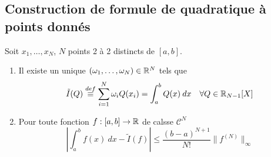 \subsection{Construction de formule de quadratique à points donnés}
\begin{prop}
    Soit $x_1, \ldots, x_N$, $N$ points 2 à 2 distincts de  $[a, b]$. 
    \begin{enumerate}
        \item Il existe un unique $(\omega_1, \ldots, \omega_N) \in \mathbb{R}^N$ tels que 
            \[
                \tilde{I}(Q) \overset{def}{\equiv} \sum_{i=1}^{N} \omega_iQ(x_i) = \int_{{a}}^{{b}} {Q(x)} \: d{x} \quad \forall Q \in \mathbb{R}_{N-1}[X]
            \] 
        \item Pour toute fonction $f: [a, b] \to \mathbb{R}$ de calsse $\mathcal{C}^N$
             \[
                 \left| \int_{{a}}^{{b}} {f(x)} \: d{x} - \tilde{I}(f) \right| \le \frac{(b-a)^{N+1}}{N!}\|f^{(N)}\|_{\infty}
            \] 
    \end{enumerate}
\end{prop}
